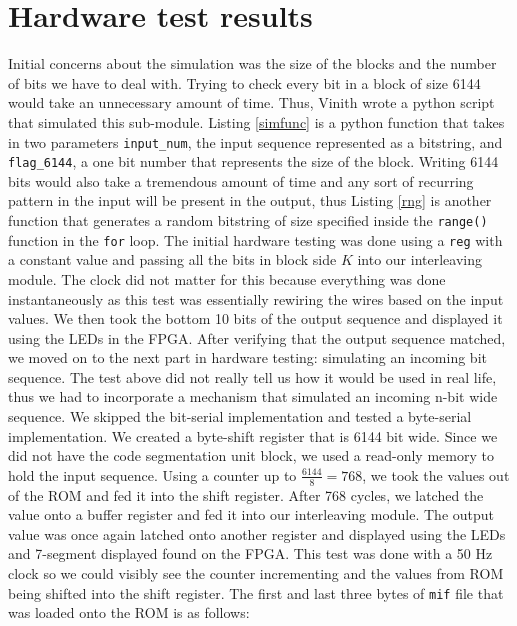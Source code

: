 \documentclass[letterpaper, 12pt]{article} %
\begin{document}
\section{Hardware test results}
Initial concerns about the simulation was the size of the blocks and the number of bits we have to deal with. Trying to check every bit in a block of size 6144 would take an unnecessary amount of time. Thus, Vinith wrote a python script that simulated this sub-module. Listing \ref{simfunc} is a python function that takes in two parameters \texttt{input\_num}, the input sequence represented as a bitstring, and \texttt{flag\_6144}, a one bit number that represents the size of the block. Writing 6144 bits would also take a tremendous amount of time and any sort of recurring pattern in the input will be present in the output, thus Listing \ref{rng} is another function that generates a random bitstring of size specified inside the \texttt{range()} function in the \texttt{for} loop.
The initial hardware testing was done using a \texttt{reg} with a constant value and passing all the bits in block side $K$ into our interleaving module. The clock did not matter for this because everything was done instantaneously as this test was essentially rewiring the wires based on the input values. We then took the bottom 10 bits of the output sequence and displayed it using the LEDs in the FPGA. After verifying that the output sequence matched, we moved on to the next part in hardware testing: simulating an incoming bit sequence.
\newline
The test above did not really tell us how it would be used in real life, thus we had to incorporate a mechanism that simulated an incoming n-bit wide sequence. We skipped the bit-serial implementation and tested a byte-serial implementation. We created a byte-shift register that is 6144 bit wide. Since we did not have the code segmentation unit block, we used a read-only memory to hold the input sequence. Using a counter up to $\frac{6144}{8} = 768$, we took the values out of the ROM and fed it into the shift register. After 768 cycles, we latched the value onto a buffer register and fed it into our interleaving module. The output value was once again latched onto another register and displayed using the LEDs and 7-segment displayed found on the FPGA. This test was done with a 50 Hz clock so we could visibly see the counter incrementing and the values from ROM being shifted into the shift register. The first and last three bytes of \texttt{mif} file that was loaded onto the ROM is as follows:
\end{document}
